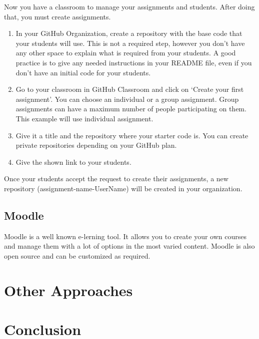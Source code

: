 \documentclass[12pt]{article}
\begin{document}
Now you have a classroom to manage your assignments and students. After doing that, you must create assignments.

\begin{enumerate}

\item In your GitHub Organization, create a repository with the base code that your students will use. This is not a required step, however you don't have any other space to explain what is required from your students. A good practice is to give any needed instructions in your README file, even if you don't have an initial code for your students.

\item Go to your classroom in GitHub Classroom and click on `Create your first assignment'. You can choose an individual or a group assignment. Group assignments can have a maximum number of people participating on them. This example will use individual assignment.

\item Give it a title and the repository where your starter code is. You can create private repositories depending on your GitHub plan.

\item Give the shown link to your students. 

\end{enumerate}

Once your students accept the request to create their assignments, a new repository (assignment-name-UserName) will be created in your organization.

\subsection{Moodle}

Moodle is a well known e-lerning tool. It allows you to create your own courses and manage them with a lot of options in the most varied content. Moodle is also open source and can be customized as required.


\section{Other Approaches}

\section{Conclusion}
\end{document}
